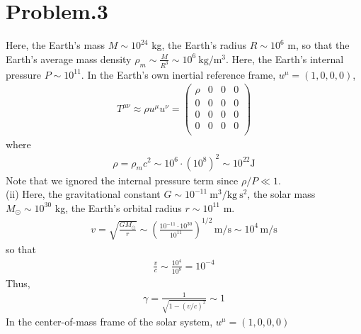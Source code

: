\documentclass[12pt]{article}
\begin{document}
\section*{Problem.3}
Here, the Earth’s mass $M \sim 10^{24}$ kg, the Earth’s radius $R \sim 10^{6}$ m, so that the Earth’s average mass density $\rho_m \sim \frac{M}{R^3} \sim 10^{6} ~\mathrm{kg/m^3}$. Here, the Earth's internal pressure $P \sim 10^{11}$. In the Earth's own inertial reference frame, $u^{\mu} = \left(1, 0, 0, 0\right)$,
\begin{align}
T^{\mu\nu} \approx \rho u^{\mu} u^{\nu} =
\begin{pmatrix}
\rho & 0 & 0 & 0 \\
0 & 0 & 0 & 0 \\
0 & 0 & 0 & 0 \\
0 & 0 & 0 & 0 \\
\end{pmatrix}
\end{align}
where
\begin{align}
\rho = \rho_m c^2 \sim 10^{6} \cdot (10^{8})^2 \sim 10^{22} \mathrm{J}
\end{align}
Note that we ignored the internal pressure term since $\rho/P \ll 1$. \\
(ii) Here, the gravitational constant  $G \sim 10^{-11} ~\mathrm{m^3/kg~s^2}$, the solar mass  $M_\odot \sim 10^{30}$ kg, the Earth’s orbital radius  $r \sim 10^{11}$ m.
\begin{align}
v = \sqrt{\frac{G M_\odot}{r}} \sim \left( \frac{10^{-11} \cdot 10^{30}}{10^{11}} \right)^{1/2} \, \mathrm{m/s} \sim 10^{4} \, \mathrm{m/s}
\end{align}
so that 
\begin{align}
\frac{v}{c} \sim \frac{10^{4}}{10^{8}} = 10^{-4}
\end{align}
Thus, 
\begin{align}
\gamma = \frac{1}{\sqrt{1 - (v/c)^2}} \sim 1
\end{align}
In the center-of-mass frame of the solar system,  $u^{\mu} = \left(1, 0, 0, 0\right)$
\end{document}
